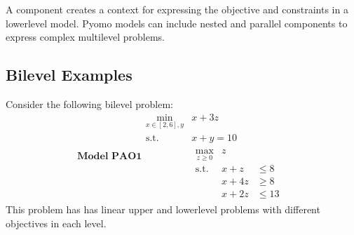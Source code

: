 \documentclass[letterpaper,10pt,english]{sphinxmanual}
\begin{document}
A {\hyperref[\detokenize{reference/pyomo:pao.pyomo.components.SubModel}]{}} component creates a context for expressing the
objective and constraints in a lower\sphinxhyphen{}level model.  Pyomo models can
include nested and parallel {\hyperref[\detokenize{reference/pyomo:pao.pyomo.components.SubModel}]{}} components to express
complex multilevel problems.


\subsection{Bilevel Examples}
\label{\detokenize{representations/pyomo:bilevel-examples}}
Consider the following bilevel problem:
\label{equation:sand:eq-pao1} \begin{equation*}
 \textbf{Model PAO1}
 \begin{array}{ll}
 \min_{x\in[2,6],y} & x + 3 z \\
 \textrm{s.t.} & x + y = 10\\
 & \begin{array}{lll}
   \max_{z \geq 0} & z &\\
   \textrm{s.t.} & x+z &\leq 8\\
   & x + 4 z &\geq 8\\
   & x + 2 z &\leq 13
   \end{array}
 \end{array}
 \end{equation*}
This problem has has linear upper\sphinxhyphen{} and lower\sphinxhyphen{}level problems with different
objectives in each level.
\end{document}
